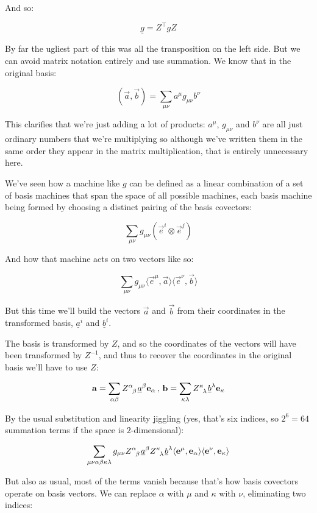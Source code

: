 And so:

$$
\underline{g} = Z^\intercal g Z
$$

By far the ugliest part of this was all the transposition on the left side. But we can avoid matrix notation entirely and use summation. We know that in the original basis:

$$
(\vec{a}, \vec{b}) = \sum_{\mu\nu} a^{\mu} g_{\mu\nu} b^{\nu}
$$

This clarifies that we're just adding a lot of products: $a^{\mu}$, $g_{\mu\nu}$ and $b^{\nu}$ are all just ordinary numbers that we're multiplying so although we've written them in the same order they appear in the matrix multiplication, that is entirely unnecessary here.

We've seen how a machine like $g$ can be defined as a linear combination of a set of basis machines that span the space of all possible machines, each basis machine being formed by choosing a distinct pairing of the basis covectors:

$$
\sum_{\mu\nu} g_{\mu\nu} (\vec{e}^i \otimes \vec{e}^j)
$$

And how that machine acts on two vectors like so:

$$
\sum_{\mu\nu} g_{\mu\nu} \langle \vec{e}^\mu,\vec{a} \rangle \langle \vec{e}^\nu,\vec{b} \rangle
$$

But this time we'll build the vectors $\vec{a}$ and $\vec{b}$ from their coordinates in the transformed basis, $\underline{a}^{i}$ and $\underline{b}^{i}$.

The basis is transformed by $Z$, and so the coordinates of the vectors will have been transformed by $Z^{-1}$, and thus to recover the coordinates in the original basis we'll have to use $Z$:

$$
\vec{a} = \sum_{\alpha\beta} Z\indices{^\alpha_\beta} \underline{a}^{\beta} \vec{e}_{\alpha}
\, , \,
\vec{b} = \sum_{\kappa\lambda} Z\indices{^\kappa_\lambda} \underline{b}^{\lambda} \vec{e}_{\kappa}
$$

By the usual substitution and linearity jiggling (yes, that's six indices, so $2^6 = 64$ summation terms if the space is $2$-dimensional):

$$
\sum_{\mu\nu\alpha\beta\kappa\lambda} g_{\mu\nu} Z\indices{^\alpha_\beta} \underline{a}^{\beta} Z\indices{^\kappa_\lambda} \underline{b}^{\lambda} \langle \vec{e}^\mu, \vec{e}_\alpha \rangle \langle \vec{e}^\nu, \vec{e}_\kappa \rangle
$$

But also as usual, most of the terms vanish because that's how basis covectors operate on basis vectors. We can replace $\alpha$ with $\mu$ and $\kappa$ with $\nu$, eliminating two indices:

